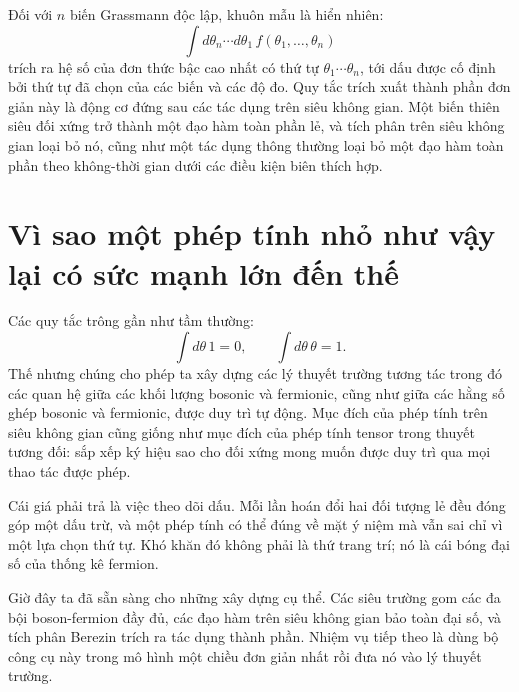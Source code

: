 Đối với \(n\) biến Grassmann độc lập, khuôn mẫu là hiển nhiên:
\begin{equation}
\int d\theta_n\cdots d\theta_1\,
f(\theta_1,\ldots,\theta_n)
\end{equation}
trích ra hệ số của đơn thức bậc cao nhất có thứ tự \(\theta_1\cdots\theta_n\), tới dấu được cố định bởi thứ tự đã chọn của các biến và các độ đo. Quy tắc trích xuất thành phần đơn giản này là động cơ đứng sau các tác dụng trên siêu không gian. Một biến thiên siêu đối xứng trở thành một đạo hàm toàn phần lẻ, và tích phân trên siêu không gian loại bỏ nó, cũng như một tác dụng thông thường loại bỏ một đạo hàm toàn phần theo không-thời gian dưới các điều kiện biên thích hợp.

\section{Vì sao một phép tính nhỏ như vậy lại có sức mạnh lớn đến thế}

Các quy tắc trông gần như tầm thường:
\begin{equation}
\int d\theta\,1=0,
\qquad
\int d\theta\,\theta=1.
\end{equation}
Thế nhưng chúng cho phép ta xây dựng các lý thuyết trường tương tác trong đó các quan hệ giữa các khối lượng bosonic và fermionic, cũng như giữa các hằng số ghép bosonic và fermionic, được duy trì tự động. Mục đích của phép tính trên siêu không gian cũng giống như mục đích của phép tính tensor trong thuyết tương đối: sắp xếp ký hiệu sao cho đối xứng mong muốn được duy trì qua mọi thao tác được phép.

Cái giá phải trả là việc theo dõi dấu. Mỗi lần hoán đổi hai đối tượng lẻ đều đóng góp một dấu trừ, và một phép tính có thể đúng về mặt ý niệm mà vẫn sai chỉ vì một lựa chọn thứ tự. Khó khăn đó không phải là thứ trang trí; nó là cái bóng đại số của thống kê fermion.

\begin{classroomqa}
\end{classroomqa}

Giờ đây ta đã sẵn sàng cho những xây dựng cụ thể. Các siêu trường gom các đa bội boson-fermion đầy đủ, các đạo hàm trên siêu không gian bảo toàn đại số, và tích phân Berezin trích ra tác dụng thành phần. Nhiệm vụ tiếp theo là dùng bộ công cụ này trong mô hình một chiều đơn giản nhất rồi đưa nó vào lý thuyết trường.
